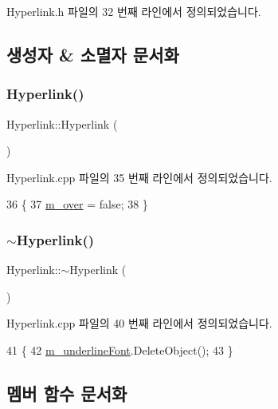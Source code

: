 Hyperlink.\+h 파일의 32 번째 라인에서 정의되었습니다.



\subsection{생성자 \& 소멸자 문서화}
\mbox{\label{class_hyperlink_a54a241958a42b58e8fdb2d532ae16714}} 
\subsubsection{\texorpdfstring{Hyperlink()}{Hyperlink()}}
{\footnotesize\ttfamily Hyperlink\+::\+Hyperlink (\begin{DoxyParamCaption}{ }\end{DoxyParamCaption})}



Hyperlink.\+cpp 파일의 35 번째 라인에서 정의되었습니다.


\begin{DoxyCode}
36 \{
37   \mbox{\hyperlink{class_hyperlink_a78f23c373fa8a3e7deb0cd9e0f8100f4}{m\_over}} = \textcolor{keyword}{false};
38 \}
\end{DoxyCode}
\mbox{\label{class_hyperlink_ae5310ef7bff2f6f70cf08493d574cc3d}} 
\subsubsection{\texorpdfstring{$\sim$\+Hyperlink()}{~Hyperlink()}}
{\footnotesize\ttfamily Hyperlink\+::$\sim$\+Hyperlink (\begin{DoxyParamCaption}{ }\end{DoxyParamCaption})\hspace{0.3cm}{\ttfamily [virtual]}}



Hyperlink.\+cpp 파일의 40 번째 라인에서 정의되었습니다.


\begin{DoxyCode}
41 \{
42   \mbox{\hyperlink{class_hyperlink_a613980484b9ae1fbbb22d84b60fa1f33}{m\_underlineFont}}.DeleteObject();
43 \}
\end{DoxyCode}


\subsection{멤버 함수 문서화}
\mbox{\label{class_hyperlink_a2b38eff4e51bdefd6f2158b0c8625659}} 
